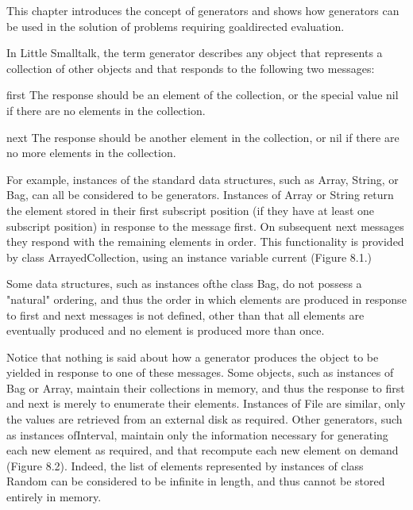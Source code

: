 \secdown

This chapter introduces the concept of generators and shows how generators can
be used in the solution of problems requiring goaldirected evaluation.

\bigskip

In Little Smalltalk, the term generator describes any object that represents a
collection of other objects and that responds to the following two messages:
\begin{description}
    \item{first} The response should be an element of the collection, or the
    special value nil if there are no elements in the collection.
    \item{next} The response should be another element in the collection, or nil
    if there are no more elements in the collection.
\end{description}

For example, instances of the standard data structures, such as Array, String,
or Bag, can all be considered to be generators. Instances of Array or String
return the element stored in their first subscript position (if they have at
least one subscript position) in response to the message first. On subsequent
next messages they respond with the remaining elements in order. This
functionality is provided by class ArrayedCollection, using an instance variable
current (Figure 8.1.)



Some data structures, such as instances ofthe class Bag, do not possess a
"natural" ordering, and thus the order in which elements are produced in
response to first and next messages is not defined, other than that all elements
are eventually produced and no element is produced more than once.

Notice that nothing is said about how a generator produces the object to be
yielded in response to one of these messages. Some objects, such as instances of
Bag or Array, maintain their collections in memory, and thus the response to
first and next is merely to enumerate their elements. Instances of File are
similar, only the values are retrieved from an external disk as required. Other
generators, such as instances ofInterval, maintain only the information
necessary for generating each new element as required, and that recompute each
new element on demand (Figure 8.2). Indeed, the list of elements represented by
instances of class Random can be considered to be infinite in length, and thus
cannot be stored entirely in memory.

